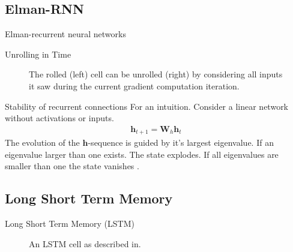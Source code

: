 \documentclass{beamer}
\begin{document}
    \subsection{Elman-RNN}
    \begin{frame}{Elman-recurrent neural networks}
      \begin{figure}
        
      \end{figure}
    \end{frame}

    \begin{frame}{Unrolling in Time}
      \begin{figure}
        \centering
        
        \caption{The rolled (left) cell can be unrolled (right) by considering all inputs it saw
        during the current gradient computation iteration.}
        \label{fig:unroll_recurrent_cell}
    \end{figure}
    \end{frame}

    \begin{frame}{Stability of recurrent connections}
      For an intuition. Consider a linear network without activations or inputs.
      \begin{align}
        \mathbf{h}_{t+1} = \mathbf{W}_h \mathbf{h}_t
      \end{align}
      The evolution of the $\mathbf{h}$-sequence is guided by it's largest eigenvalue.
      If an eigenvalue larger than one exists. The state explodes.
      If all eigenvalues are smaller than one the state vanishes
      \cite{goodfellow2016deep}.
    \end{frame}

    \subsection{Long Short Term Memory}
    \begin{frame}{Long Short Term Memory (LSTM)}
      \begin{figure}
        
        \caption{An LSTM cell as described in\cite{hochreiter1997long,greff2016lstm}.}
      \end{figure}

    \end{frame}
\end{document}

